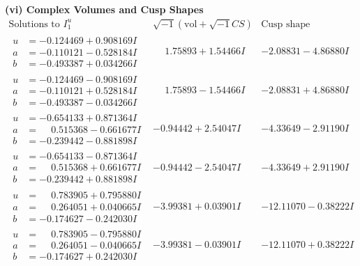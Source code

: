 \documentclass[1p]{elsarticle_modified}
\theoremstyle{definition}
\newcommand{\I}{\sqrt{-1}}
\begin{document}
\newpage\flushleft \textbf{(vi) Complex Volumes and Cusp Shapes}
$$\begin{array}{c|c|c}  
\text{Solutions to }I^u_{1}& \I (\text{vol} + \sqrt{-1}CS) & \text{Cusp shape}\\
 \hline 
\begin{aligned}
u &= -0.124469 + 0.908169 I \\
a &= -0.110121 - 0.528184 I \\
b &= -0.493387 + 0.034266 I\end{aligned}
 & \phantom{-}1.75893 + 1.54466 I & -2.08831 - 4.86880 I \\ \hline\begin{aligned}
u &= -0.124469 - 0.908169 I \\
a &= -0.110121 + 0.528184 I \\
b &= -0.493387 - 0.034266 I\end{aligned}
 & \phantom{-}1.75893 - 1.54466 I & -2.08831 + 4.86880 I \\ \hline\begin{aligned}
u &= -0.654133 + 0.871364 I \\
a &= \phantom{-}0.515368 - 0.661677 I \\
b &= -0.239442 - 0.881898 I\end{aligned}
 & -0.94442 + 2.54047 I & -4.33649 - 2.91190 I \\ \hline\begin{aligned}
u &= -0.654133 - 0.871364 I \\
a &= \phantom{-}0.515368 + 0.661677 I \\
b &= -0.239442 + 0.881898 I\end{aligned}
 & -0.94442 - 2.54047 I & -4.33649 + 2.91190 I \\ \hline\begin{aligned}
u &= \phantom{-}0.783905 + 0.795880 I \\
a &= \phantom{-}0.264051 + 0.040665 I \\
b &= -0.174627 - 0.242030 I\end{aligned}
 & -3.99381 + 0.03901 I & -12.11070 - 0.38222 I \\ \hline\begin{aligned}
u &= \phantom{-}0.783905 - 0.795880 I \\
a &= \phantom{-}0.264051 - 0.040665 I \\
b &= -0.174627 + 0.242030 I\end{aligned}
 & -3.99381 - 0.03901 I & -12.11070 + 0.38222 I \\ \hline\begin{aligned}

\end{aligned}
\end{array}$$
\end{document}
